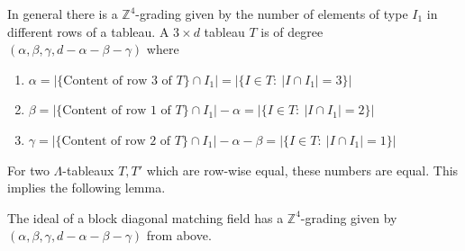 

 
 In general there is a $\mathbb{Z}^4$-grading given by the number of elements of type $I_1$ in different rows of a tableau. A $3\times d$ tableau $T$ is of degree $(\alpha, \beta,\gamma, d-\alpha-\beta-\gamma)$ 
 where 
\begin{enumerate}
\item $\alpha=|\{\text{Content of row 3 of } T\}\cap I_1| = |\{I\in T: \ |I \cap I_1| = 3\}|$ 
\item $\beta=|\{\text{Content of row 1 of } T\}\cap I_1|-\alpha = |\{I\in T: \ |I \cap I_1| = 2\}|$ 
\item $\gamma=|\{\text{Content of row 2 of } T\}\cap I_1|-\alpha-\beta = |\{I\in T: \ |I \cap I_1| = 1\}|$ 
\end{enumerate}
For two $\Lambda$-tableaux $T,T'$ which are row-wise equal, these numbers are equal. This implies the following lemma.
 
 
\begin{lemm}\label{lem:homo}
The ideal of a block diagonal matching field
has a $\mathbb{Z}^4$-grading given by $(\alpha, \beta,\gamma, d-\alpha-\beta-\gamma)$
from above. 
 \end{lemm}
 
 
 

